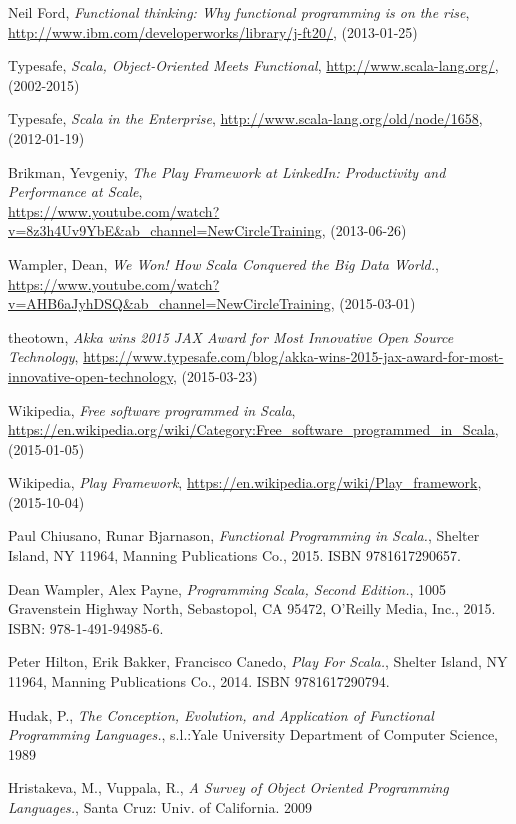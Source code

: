 \documentclass[12pt,twoside,a4paper]{report}
\begin{document}
\begin{thebibliography}{99}

Neil Ford,
\emph{Functional thinking: Why functional programming is on the rise},
\url{http://www.ibm.com/developerworks/library/j-ft20/},
(2013-01-25)

Typesafe,
\emph{Scala, Object-Oriented Meets Functional},
\url{http://www.scala-lang.org/},
(2002-2015)
	
Typesafe,
\emph{Scala in the Enterprise},
\url{http://www.scala-lang.org/old/node/1658},
(2012-01-19)

Brikman, Yevgeniy,
\emph{The Play Framework at LinkedIn: Productivity and Performance at Scale},\\
\url{https://www.youtube.com/watch?v=8z3h4Uv9YbE&ab_channel=NewCircleTraining},
(2013-06-26)

Wampler, Dean,
\emph{We Won! How Scala Conquered the Big Data World.},
\url{https://www.youtube.com/watch?v=AHB6aJyhDSQ&ab_channel=NewCircleTraining},
(2015-03-01)

theotown,
\emph{Akka wins 2015 JAX Award for Most Innovative Open Source Technology},
\url{https://www.typesafe.com/blog/akka-wins-2015-jax-award-for-most-innovative-open-technology},
(2015-03-23)
	
Wikipedia,
\emph{Free software programmed in Scala},
\url{https://en.wikipedia.org/wiki/Category:Free_software_programmed_in_Scala},
(2015-01-05)
	
Wikipedia,
\emph{Play Framework},
\url{https://en.wikipedia.org/wiki/Play_framework},
(2015-10-04)
	
Paul Chiusano, Runar Bjarnason,
\emph{Functional Programming in Scala.},
Shelter Island, NY 11964,
Manning Publications Co., 2015. ISBN 9781617290657.

Dean Wampler, Alex Payne,
\emph{Programming Scala, Second Edition.},
1005 Gravenstein Highway North, Sebastopol, CA 95472,
O’Reilly Media, Inc., 2015. ISBN: 978-1-491-94985-6.
	
Peter Hilton, Erik Bakker, Francisco Canedo,
\emph{Play For Scala.},
Shelter Island, NY 11964,
Manning Publications Co., 2014. ISBN 9781617290794.

Hudak, P.,
\emph{The Conception, Evolution, and Application of Functional Programming Languages.},
s.l.:Yale University Department of Computer Science,
1989

Hristakeva, M., Vuppala, R.,
\emph{A Survey of Object Oriented Programming Languages.},
Santa Cruz: Univ. of California.
2009


\end{thebibliography}
\end{document}
